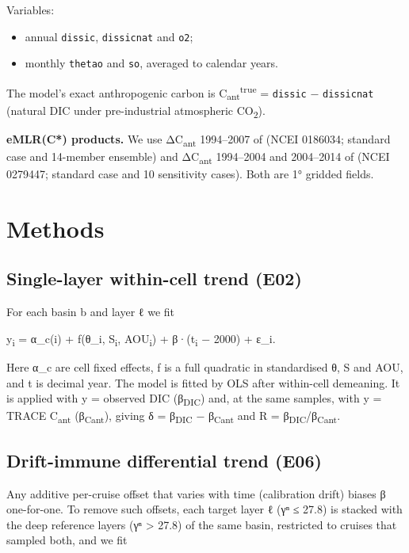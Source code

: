 \documentclass[11pt]{article}
\providecommand{\tightlist}{\setlength{\itemsep}{0pt}\setlength{\parskip}{0pt}}
\begin{document}
Variables:

\begin{itemize}
\tightlist
\item
  annual \texttt{dissic}, \texttt{dissicnat} and \texttt{o2};
\item
  monthly \texttt{thetao} and \texttt{so}, averaged to calendar years.
\end{itemize}

The model's exact anthropogenic carbon is
C\textsubscript{ant}\textsuperscript{true} = \texttt{dissic} −
\texttt{dissicnat} (natural DIC under pre-industrial atmospheric
CO\textsubscript{2}).

\textbf{eMLR(C*) products.} We use ΔC\textsubscript{ant} 1994--2007 of
\citet{Gruber2019} (NCEI 0186034; standard case and 14-member ensemble)
and ΔC\textsubscript{ant} 1994--2004 and 2004--2014 of
\citet{Mueller2023} (NCEI 0279447; standard case and 10 sensitivity
cases). Both are 1° gridded fields.

\section{Methods}\label{methods}

\subsection{Single-layer within-cell trend
(E02)}\label{single-layer-within-cell-trend-e02}

For each basin b and layer ℓ we fit

y\textsubscript{i} = α\_c(i) + f(θ\_i, S\textsubscript{i},
AOU\textsubscript{i}) + β·(t\textsubscript{i} − 2000) + ε\_i.

Here α\_c are cell fixed effects, f is a full quadratic in standardised
θ, S and AOU, and t is decimal year. The model is fitted by OLS after
within-cell demeaning. It is applied with y = observed DIC
(β\textsubscript{DIC}) and, at the same samples, with y = TRACE
C\textsubscript{ant} (β\textsubscript{Cant}), giving δ =
β\textsubscript{DIC} − β\textsubscript{Cant} and R =
β\textsubscript{DIC}/β\textsubscript{Cant}.

\subsection{Drift-immune differential trend
(E06)}\label{drift-immune-differential-trend-e06}

Any additive per-cruise offset that varies with time (calibration drift)
biases β one-for-one. To remove such offsets, each target layer ℓ (γⁿ ≤
27.8) is stacked with the deep reference layers (γⁿ \textgreater{} 27.8)
of the same basin, restricted to cruises that sampled both, and we fit
\end{document}

